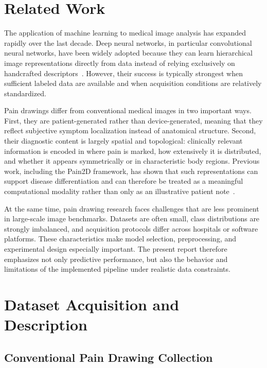 \documentclass[12pt]{report}
\begin{document}
\chapter{Related Work}

The application of machine learning to medical image analysis has expanded rapidly over the last decade. Deep neural networks, in particular convolutional neural networks, have been widely adopted because they can learn hierarchical image representations directly from data instead of relying exclusively on handcrafted descriptors~\cite{litjens2017survey, lecun2015deep}. However, their success is typically strongest when sufficient labeled data are available and when acquisition conditions are relatively standardized.

Pain drawings differ from conventional medical images in two important ways. First, they are patient-generated rather than device-generated, meaning that they reflect subjective symptom localization instead of anatomical structure. Second, their diagnostic content is largely spatial and topological: clinically relevant information is encoded in where pain is marked, how extensively it is distributed, and whether it appears symmetrically or in characteristic body regions. Previous work, including the Pain2D framework, has shown that such representations can support disease differentiation and can therefore be treated as a meaningful computational modality rather than only as an illustrative patient note~\cite{emmert2018pain2d, wester2020pain}.

At the same time, pain drawing research faces challenges that are less prominent in large-scale image benchmarks. Datasets are often small, class distributions are strongly imbalanced, and acquisition protocols differ across hospitals or software platforms. These characteristics make model selection, preprocessing, and experimental design especially important. The present report therefore emphasizes not only predictive performance, but also the behavior and limitations of the implemented pipeline under realistic data constraints.

\chapter{Dataset Acquisition and Description}

\section{Conventional Pain Drawing Collection}
\end{document}
